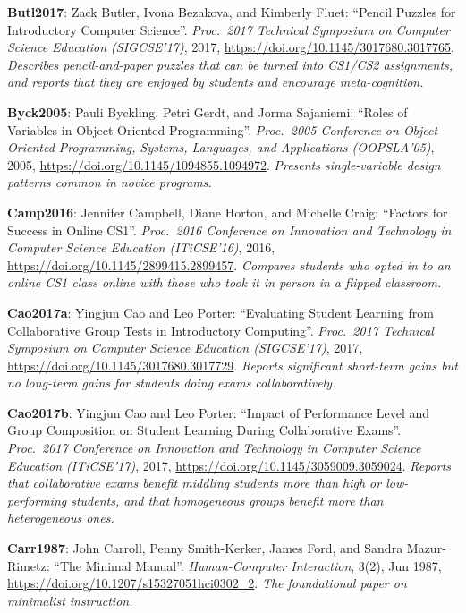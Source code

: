 \textbf{\hypertarget{b:Butl2017}{Butl2017}\label{b:Butl2017}}: Zack Butler, Ivona Bezakova, and Kimberly Fluet: ``Pencil Puzzles for Introductory Computer Science''. \emph{Proc.\ 2017 Technical Symposium on Computer Science Education (SIGCSE'17)}, 2017, \url{https://doi.org/10.1145/3017680.3017765}. \emph{Describes pencil-and-paper puzzles that can be turned into CS1/CS2 assignments, and reports that they are enjoyed by students and encourage meta-cognition.}

\textbf{\hypertarget{b:Byck2005}{Byck2005}\label{b:Byck2005}}: Pauli Byckling, Petri Gerdt, and Jorma Sajaniemi: ``Roles of Variables in Object-Oriented Programming''. \emph{Proc.\ 2005 Conference on Object-Oriented Programming, Systems, Languages, and Applications (OOPSLA'05)}, 2005, \url{https://doi.org/10.1145/1094855.1094972}. \emph{Presents single-variable design patterns common in novice programs.}

\textbf{\hypertarget{b:Camp2016}{Camp2016}\label{b:Camp2016}}: Jennifer Campbell, Diane Horton, and Michelle Craig: ``Factors for Success in Online CS1''. \emph{Proc.\ 2016 Conference on Innovation and Technology in Computer Science Education (ITiCSE'16)}, 2016, \url{https://doi.org/10.1145/2899415.2899457}. \emph{Compares students who opted in to an online CS1 class online with those who took it in person in a flipped classroom.}

\textbf{\hypertarget{b:Cao2017a}{Cao2017a}\label{b:Cao2017a}}: Yingjun Cao and Leo Porter: ``Evaluating Student Learning from Collaborative Group Tests in Introductory Computing''. \emph{Proc.\ 2017 Technical Symposium on Computer Science Education (SIGCSE'17)}, 2017, \url{https://doi.org/10.1145/3017680.3017729}. \emph{Reports significant short-term gains but no long-term gains for students doing exams collaboratively.}

\textbf{\hypertarget{b:Cao2017b}{Cao2017b}\label{b:Cao2017b}}: Yingjun Cao and Leo Porter: ``Impact of Performance Level and Group Composition on Student Learning During Collaborative Exams''. \emph{Proc.\ 2017 Conference on Innovation and Technology in Computer Science Education (ITiCSE'17)}, 2017, \url{https://doi.org/10.1145/3059009.3059024}. \emph{Reports that collaborative exams benefit middling students more than high or low-performing students, and that homogeneous groups benefit more than heterogeneous ones.}

\textbf{\hypertarget{b:Carr1987}{Carr1987}\label{b:Carr1987}}: John Carroll, Penny Smith-Kerker, James Ford, and Sandra Mazur-Rimetz: ``The Minimal Manual''. \emph{Human-Computer Interaction}, 3(2), Jun 1987, \url{https://doi.org/10.1207/s15327051hci0302_2}. \emph{The foundational paper on minimalist instruction.}


